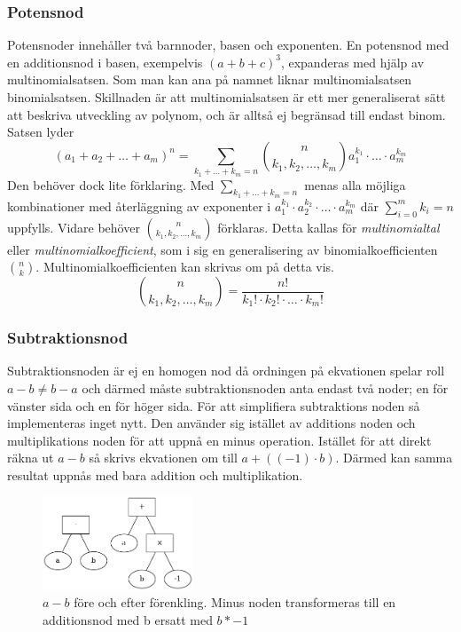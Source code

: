 \documentclass[12pt,a4paper]{article}
\begin{document}
\subsubsection{Potensnod}
Potensnoder innehåller två barnnoder, basen och exponenten. En potensnod med en additionsnod i basen, exempelvis \((a+b+c)^{3}\), expanderas med hjälp av multinomialsatsen. Som man kan ana på namnet liknar multinomialsatsen binomialsatsen. Skillnaden är att multinomialsatsen är ett mer generaliserat sätt att beskriva utveckling av polynom, och är alltså ej begränsad till endast binom. Satsen lyder
\[(a_{1}+a_{2}+\ldots+a_{m})^{n}=\displaystyle\sum_{k_{1}+\dots+k_{m}=n}\binom{n}{k_{1},k_{2},\dots,k_{m}}a_{1}^{k_{1}}\cdot\ldots\cdot a_{m}^{k_{m}}\]
Den behöver dock lite förklaring. Med \(\displaystyle\sum_{k_{1}+\dots+k_{m}=n}\) menas alla möjliga kombinationer med återläggning av exponenter i \(a_{1}^{k_{1}}\cdot a_{2}^{k_{2}}\cdot\ldots\cdot a_{m}^{k_{m}}\) där \(\displaystyle\sum_{i=0}^{m}k_{i}=n\) uppfylls. Vidare behöver  \(\binom{n}{k_{1},k_{2},\ldots,k_{m}}\) förklaras. Detta kallas för \textit{multinomialtal} eller \textit{multinomialkoefficient}, som i sig en generalisering av binomialkoefficienten \(\binom{n}{k}\). Multinomialkoefficienten kan skrivas om på detta vis.
\[\binom{n}{k_{1},k_{2},\ldots,k_{m}}=\frac{n!}{k_{1}!\cdot k_{2}!\cdot\ldots\cdot k_{m}!}\]
\subsubsection{Subtraktionsnod}
Subtraktionsnoden är ej en homogen nod då ordningen på ekvationen spelar roll \(a-b\neq b-a\) och därmed måste subtraktionsnoden anta endast två noder; en för vänster sida och en för höger sida. För att simplifiera subtraktions noden så implementeras inget nytt. Den använder sig istället av additions noden och multiplikations noden för att uppnå en minus operation. Istället för att direkt räkna ut \(a-b\) så skrivs ekvationen om till \(a+((-1)\cdot b)\). Därmed kan samma resultat uppnås med bara addition och multiplikation.
\begin{figure}[h!]
  \centering
  \includegraphics[width=0.4\textwidth]{image-merged3.png}
  \caption{\(a-b\) före och efter förenkling. Minus noden transformeras till en additionsnod med b ersatt med \(b*-1\)}
\end{figure}
\end{document}
